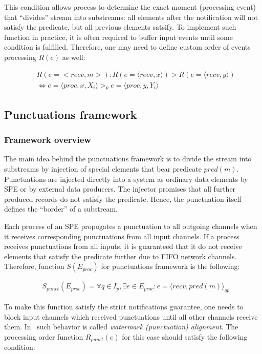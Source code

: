 This condition allows process to determine the exact moment (processing event) that ``divides'' stream into substreams: all elements after the notification will not satisfy the predicate, but all previous elements satsify. To implement such function in practice, it is often required to buffer input events until some condition is fulfilled. Therefore, one may need to define custom order of events processing $R(e)$ as well:

\begin{align*}
& R(e=<recv,m>): R(e=\langle recv, x\rangle) > R(e=\langle recv, y\rangle) \\
& \Longleftrightarrow e=\langle proc,x,X_i\rangle >_p e=\langle proc,y,Y_i\rangle
\end{align*}

\subsection{Punctuations framework}

\subsubsection{Framework overview}

The main idea behind the punctuations framework is to divide the stream into substreams by injection of special elements that bear predicate $pred(m)$. Punctuations are injected directly into a system as ordinary data elements by SPE or by external data producers. The injector promises that all further produced records do not satisfy the predicate. Hence, the punctuation itself defines the ``border'' of a substream.

Each process of an SPE propogates a punctuation to all outgoing channels when it receives corresponding punctuations from all input channels. If a process receives punctuations from all inputs, it is guaranteed that it do not receive elements that satisfy the predicate further due to FIFO network channels. Therefore, function $S(E_{proc})$ for punctuations framework is the following:

\begin{align*}
& S_{punct}(E_{proc}) = \forall q \in I_p, \exists e \in E_{proc} : e = \langle recv,pred(m)\rangle_{qp}
\end{align*}

To make this function satisfy the strict notifications guarantee, one needs to block input channels which received punctuations until all other channels receive them. In~\cite{Carbone:2017:SMA:3137765.3137777} such behavior is called {\em watermark (punctuation) alignment}. The processing order function $R_{punct}(e)$ for this case should satisfy the following condition:

